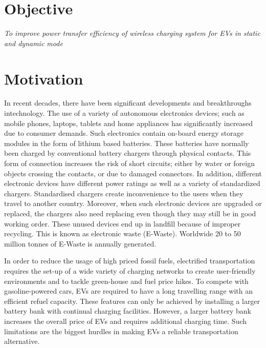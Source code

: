 \documentclass[12pt]{article}
\begin{document}

\tableofcontents
\newpage

\renewcommand{\baselinestretch}{1.5}
\section{Objective}
\textit{To improve power transfer efficiency of wireless charging system for EVs in static and dynamic mode}

\section{Motivation}
In recent decades, there have been significant developments and breakthroughs intechnology. The use of a variety of autonomous electronics devices; such as mobile phones, laptops, tablets and home appliances has significantly increased due to consumer demands. Such electronics contain on-board energy storage modules in the form of lithium based batteries. These batteries have normally been charged by conventional battery chargers through physical contacts. This form of connection increases the risk of short circuits; either by water or foreign objects crossing the contacts, or due to damaged connectors. In addition, different electronic devices have different power ratings as well as a variety of standardized chargers. Standardised chargers create inconvenience to the users when they travel to another country. Moreover, when such electronic devices are upgraded or replaced, the chargers also need replacing even though they may still be in good working order. These unused devices end up in landfill because of improper recycling. This is known as electronic waste (E-Waste). Worldwide 20 to 50 million tonnes of E-Waste is annually generated.

In order to reduce the usage of high priced fossil fuels, electrified transportation requires the set-up of a wide variety of charging networks to create user-friendly environments and to tackle green-house and fuel price hikes. To compete with gasoline-powered cars, EVs are required to have a long travelling range with an efficient refuel capacity. These features can only be achieved by installing a larger battery bank with continual charging facilities. However, a larger battery bank increases the overall price of EVs and requires additional charging time. Such limitations are the biggest hurdles in making EVs a reliable transportation alternative. 
\end{document}
